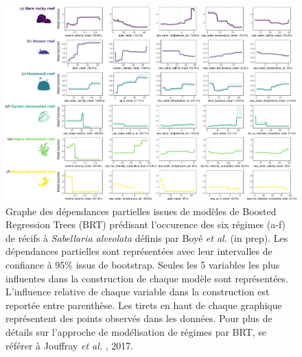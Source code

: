 \documentclass[12pt]{report}
\begin{document}
\begin{figure}
    \centering
    \includegraphics[height = \textwidth, width = .9\textheight,angle = 90]{boyé_ff.png}
    \caption[]{Graphe des dépendances partielles issues de modèles de Boosted Regression Trees (BRT) prédisant l'occurence des six régimes (a-f) de récifs à \textit{Sabellaria alveolata} définis par Boyé \textit{et al.} (in prep). Les dépendances partielles sont représentées avec leur intervalles de confiance à 95\% issus de bootstrap. Seules les 5 variables les plus influentes dans la construction de chaque modèle sont représentées. L'influence relative de chaque variable dans la construction est reportée entre parenthèse. Les tirets en haut de chaque graphique représentent des points observés dans les données. Pour plus de détails sur l'approche de modélisation de régimes par BRT, se référer à Jouffray\textit{ et al. }, 2017.
}
    \label{fig:4anx}
\end{figure}
\end{document}
